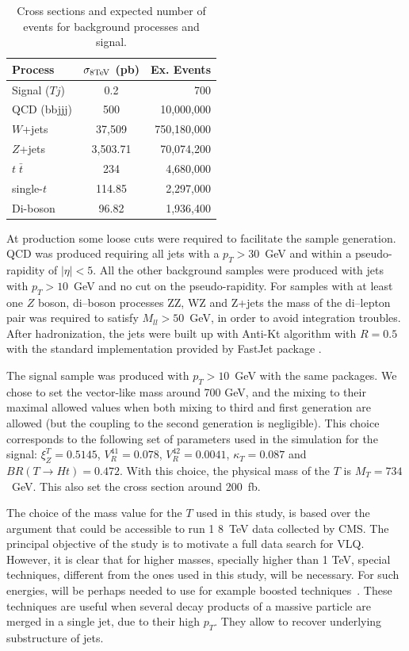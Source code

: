 \begin{table}[htbH]
\label{tab:xsec}
\begin{center}
\begin{tabular}{||l|c|r||}
  \hline\hline
  Process & $\sigma_{\rm 8 TeV}$ (pb) & Ex. Events \\ \hline
 Signal ($Tj$) & 0.2 & 700 \\
 \hline
  QCD (bbjjj) & 500 & 10,000,000 \\
  $W$+jets & 37,509 & 750,180,000 \\
  $Z$+jets & 3,503.71 & 70,074,200 \\ 
  $t\; \bar{t}$ & 234 & 4,680,000 \\
  single-$t$ & 114.85 & 2,297,000 \\
  Di-boson & 96.82 & 1,936,400 \\
  \hline\hline
\end{tabular}
\caption{Cross sections and expected number of events for background processes and signal.}
\end{center}
\end{table}

At production some loose cuts were required to facilitate the sample generation. QCD was produced requiring all jets with a $p_{T}>30$~GeV and within a pseudo-rapidity of $|\eta|<5$. All the other background samples were produced with jets with $p_{T}>10$~GeV and no cut on the pseudo-rapidity. For samples with at least one $Z$ boson, di--boson processes ZZ, WZ and Z+jets the mass of the di--lepton pair was required to satisfy $M_{ll}>50$~GeV, in order to avoid integration troubles. After hadronization, the jets were built up with Anti-Kt algorithm with $R=0.5$ with the standard implementation provided by FastJet package \cite{Cacciari:2011ma}.

The signal sample was produced with $p_{T}>10$~GeV with the same packages. We chose to set the vector-like mass around 700 GeV, and the mixing to their maximal allowed values when both mixing to third and first generation are allowed (but the coupling to the second generation is negligible). This choice corresponds to the following set of parameters used in the simulation for the signal: $\xi_Z^{T}=0.5145$, $V_{R}^{41}=0.078$, $V_{R}^{42}=0.0041$, $\kappa_{T}=0.087$ and $BR(T \to H t)=0.472$. With this choice, the physical mass of the $T$ is $M_{T}=734$~GeV. This also set the cross section around 200~fb. 

The choice of the mass value for the $T$ used in this study, is based over the argument that could be accessible to run 1 8~TeV data collected by CMS. The principal objective of the study is to motivate a full data search for VLQ. However, it is clear that for higher masses, specially higher than 1 TeV, special techniques, different from the ones used in this study, will be necessary. For such energies, will be perhaps needed to use for example boosted techniques~\cite{CMS:2013vca, TheATLAScollaboration:2013qia, Usai:2015vva}. These techniques are useful when several decay products of a massive particle are merged in a single jet, due to their high $p_{T}$. They allow to recover underlying substructure of jets. 

